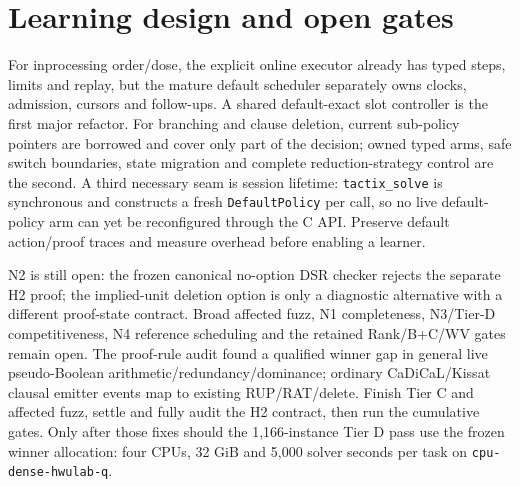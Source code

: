 \documentclass[10pt]{article}
\begin{document}
\section*{Learning design and open gates}
For inprocessing order/dose, the explicit online executor already has typed
steps, limits and replay, but the mature default scheduler separately owns
clocks, admission, cursors and follow-ups. A shared default-exact slot
controller is the first major refactor. For branching and clause deletion,
current sub-policy pointers are borrowed and cover only part of the decision;
owned typed arms, safe switch boundaries, state migration and complete
reduction-strategy control are the second. A third necessary seam is session
lifetime: \texttt{tactix\_solve} is synchronous and constructs a fresh
\texttt{DefaultPolicy} per call, so no live default-policy arm can yet be
reconfigured through the C API. Preserve default action/proof traces and
measure overhead before enabling a learner.

N2 is still open: the frozen canonical no-option DSR checker rejects the
separate H2 proof; the implied-unit deletion option is only a diagnostic
alternative with a different proof-state contract. Broad affected fuzz,
N1 completeness, N3/Tier-D competitiveness, N4 reference scheduling and the
retained Rank/B+C/WV gates remain open. The proof-rule audit found a qualified
winner gap in general live pseudo-Boolean arithmetic/redundancy/dominance;
ordinary CaDiCaL/Kissat clausal emitter events map to existing RUP/RAT/delete.
Finish Tier C and affected fuzz, settle and fully audit the H2 contract, then
run the cumulative gates. Only after those fixes should the 1,166-instance
Tier D pass use the frozen winner allocation: four CPUs, 32 GiB and 5,000
solver seconds per task on \texttt{cpu-dense-hwulab-q}.
\end{document}
